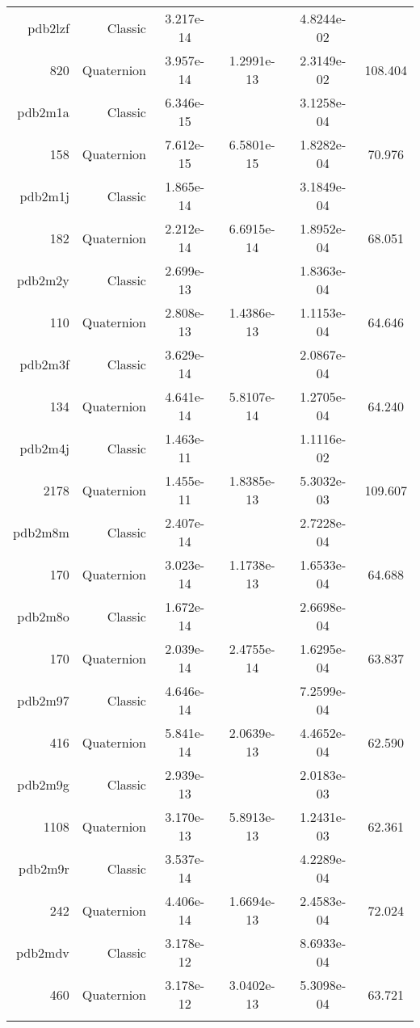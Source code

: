 \begin{xltabular}{\textwidth}{r|rS[table-format=1.3e+2]S[table-format=1.4e+2]S[table-format=1.4e+2]S[table-format=-1.3]}
pdb2lzf & Classic & 3.217e-14 &  & 4.8244e-02 & \\
820 & Quaternion & 3.957e-14 & 1.2991e-13 & 2.3149e-02 & 108.404\\  \addlinespace
pdb2m1a & Classic & 6.346e-15 &  & 3.1258e-04 & \\
158 & Quaternion & 7.612e-15 & 6.5801e-15 & 1.8282e-04 & 70.976\\  \addlinespace
pdb2m1j & Classic & 1.865e-14 &  & 3.1849e-04 & \\
182 & Quaternion & 2.212e-14 & 6.6915e-14 & 1.8952e-04 & 68.051\\  \addlinespace
pdb2m2y & Classic & 2.699e-13 &  & 1.8363e-04 & \\
110 & Quaternion & 2.808e-13 & 1.4386e-13 & 1.1153e-04 & 64.646\\  \addlinespace
pdb2m3f & Classic & 3.629e-14 &  & 2.0867e-04 & \\
134 & Quaternion & 4.641e-14 & 5.8107e-14 & 1.2705e-04 & 64.240\\  \addlinespace
pdb2m4j & Classic & 1.463e-11 &  & 1.1116e-02 & \\
2178 & Quaternion & 1.455e-11 & 1.8385e-13 & 5.3032e-03 & 109.607\\  \addlinespace
pdb2m8m & Classic & 2.407e-14 &  & 2.7228e-04 & \\
170 & Quaternion & 3.023e-14 & 1.1738e-13 & 1.6533e-04 & 64.688\\  \addlinespace
pdb2m8o & Classic & 1.672e-14 &  & 2.6698e-04 & \\
170 & Quaternion & 2.039e-14 & 2.4755e-14 & 1.6295e-04 & 63.837\\  \addlinespace
pdb2m97 & Classic & 4.646e-14 &  & 7.2599e-04 & \\
416 & Quaternion & 5.841e-14 & 2.0639e-13 & 4.4652e-04 & 62.590\\  \addlinespace
pdb2m9g & Classic & 2.939e-13 &  & 2.0183e-03 & \\
1108 & Quaternion & 3.170e-13 & 5.8913e-13 & 1.2431e-03 & 62.361\\  \addlinespace
pdb2m9r & Classic & 3.537e-14 &  & 4.2289e-04 & \\
242 & Quaternion & 4.406e-14 & 1.6694e-13 & 2.4583e-04 & 72.024\\  \addlinespace
pdb2mdv & Classic & 3.178e-12 &  & 8.6933e-04 & \\
460 & Quaternion & 3.178e-12 & 3.0402e-13 & 5.3098e-04 & 63.721\\  \addlinespace

\end{xltabular}
